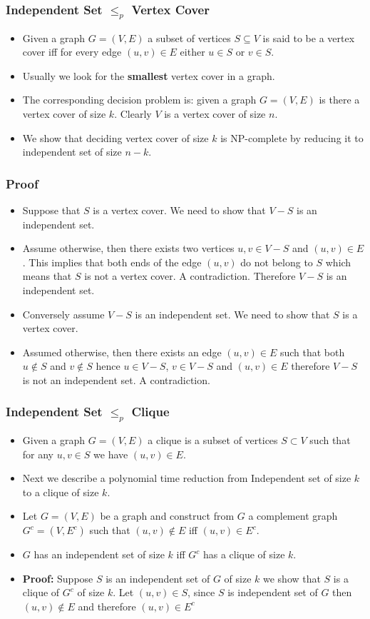 \documentclass{beamer}
\begin{document}
\begin{frame}
  \frametitle{Independent Set $\le_p$ Vertex Cover}
  \begin{itemize}
  \item Given a graph $G=(V,E)$ a subset of vertices $S\subseteq V$ is said to be a vertex cover iff for every edge $(u,v)\in E$ either $u\in S$ or $v\in S$.
  \item Usually we look for the \textbf{smallest} vertex cover in a graph.
  \item The corresponding decision problem is: given a graph $G=(V,E)$ is there a vertex cover of size $k$. Clearly $V$ is a vertex cover of size $n$.
  \item We show that deciding vertex cover of size $k$ is NP-complete by reducing it to independent set of size $n-k$.
  
  \end{itemize}

\end{frame}
\begin{frame}
  \frametitle{Proof}
  \begin{itemize}
  \item Suppose that $S$ is a vertex cover. We need to show that $V-S$ is an independent  set.
  \item Assume otherwise, then there exists two vertices $u,v\in V-S$ and  $(u,v)\in E$. This implies that   both ends of the edge $(u,v)$ do not belong to $S$ which means that $S$ is not a vertex cover. A contradiction. Therefore  $V-S$ is an independent set.
\item Conversely assume $V-S$ is an independent set. We need to show that $S$ is a vertex cover.
 \item Assumed otherwise, then there exists an edge $(u,v)\in E$ such that both $u\notin S$ and $v\notin S$ hence $u\in V-S$, $v\in V-S$ and $(u,v)\in E$ therefore $V-S$ is not an independent set. A contradiction.
  \end{itemize}
\end{frame}
\begin{frame}
  \frametitle{Independent Set $\le_p$ Clique}
  \begin{itemize}
  \item Given a graph $G=(V,E)$ a clique is a subset of vertices $S\subset V$ such that for any $u,v\in S$ we have $(u,v)\in E$.
  \item Next we describe a polynomial time reduction from Independent set of size $k$ to a clique of size $k$.
  \item Let $G=(V,E)$ be a graph and construct from $G$ a complement  graph  $G^c=(V,E^c)$ such that  $(u,v)\notin E$ iff $(u,v)\in E^c$.
  \item $G$ has an independent set of size $k$ iff $G^c$ has a clique of size $k$.
  \item \textbf{Proof:} Suppose $S$ is an independent set of $G$ of size $k$ we show that $S$ is a clique of $G^c$ of size $k$. Let $(u,v)\in S$, since $S$ is independent set of $G$ then $(u,v)\notin E$ and therefore $(u,v)\in E^c$
  \end{itemize}
\end{frame}
\end{document}
